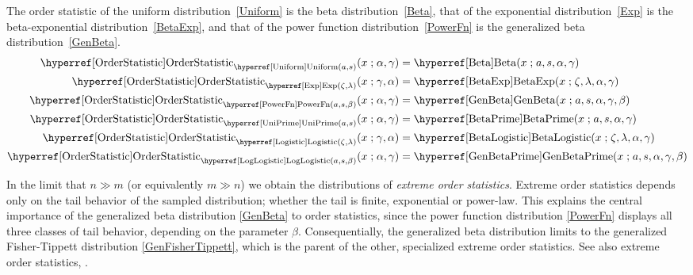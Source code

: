 The order statistic of the uniform distribution~\eqref{Uniform} is the beta distribution~\eqref{Beta}, that of the exponential distribution~\eqref{Exp} is the beta-exponential distribution~\eqref{BetaExp}, and that of the  power function distribution~\eqref{PowerFn} is the generalized beta distribution~\eqref{GenBeta}.
\begin{align*}
\opr{OrderStatistic}_{\opr{Uniform}(a,s)}(x \given \alpha, \gamma)
 & = 
 \opr{Beta}(x\given a, s, \alpha, \gamma) 
\checked
\\
\opr{OrderStatistic}_{\opr{Exp}(\pLoc,\pScale)}  (x \given  \gamma, \alpha) 
& = \opr{BetaExp}(x\given \pLoc, \pScale,  \alpha, \gamma) 
\checked
\\
\opr{OrderStatistic}_{\opr{PowerFn}(a,s,\beta)} (x \given \alpha, \gamma) 
&= \opr{GenBeta}(x\given a, s,\alpha, \gamma, \beta) 
\checked
\\
\opr{OrderStatistic}_{\opr{UniPrime}(a,s)}(x \given \alpha, \gamma)
&=  \opr{BetaPrime}(x\given a, s, \alpha, \gamma) 
\checked
\\
\opr{OrderStatistic}_{\opr{Logistic}(\pLoc,\pScale)}  (x \given  \gamma, \alpha)
&=  \opr{BetaLogistic}(x\given \pLoc, \pScale,   \alpha, \gamma)
\\
 \opr{OrderStatistic}_{\opr{LogLogistic}(a,s,\beta)}  (x \given \alpha, \gamma ) 
& =  \opr{GenBetaPrime}(x\given a, s, \alpha, \gamma , \beta) 
\checked
\end{align*}




In the limit that $n\gg m$ (or equivalently $m\gg n$) we obtain the distributions of {\it extreme order statistics}. Extreme order statistics depends only on the tail behavior of the sampled distribution; whether the tail is finite, exponential or power-law. This explains the central importance of the generalized beta distribution \eqref{GenBeta} to order statistics, since the power function distribution \eqref{PowerFn} displays all three classes of tail behavior, depending on the parameter $\beta$. Consequentially, the generalized beta distribution limits to the generalized Fisher-Tippett distribution \eqref{GenFisherTippett}, which is the parent of the other, specialized extreme order statistics. See also extreme order statistics, .


